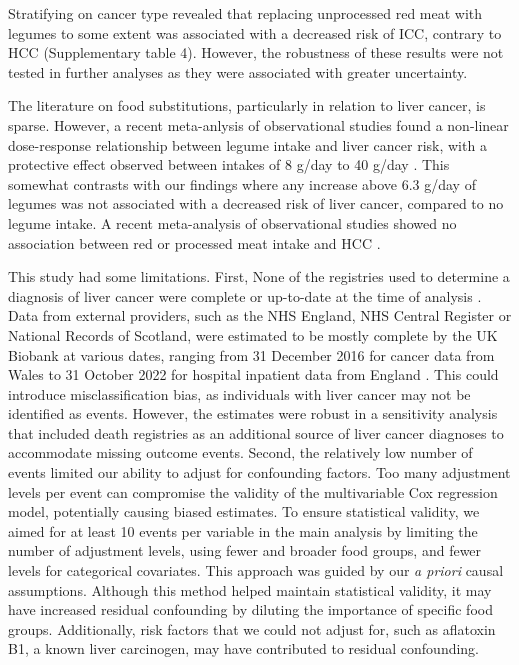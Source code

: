 \documentclass[sn-basic,Numbered,pdflatex]{sn-jnl}
\begin{document}
Stratifying on cancer type revealed that replacing unprocessed red meat
with legumes to some extent was associated with a decreased risk of ICC,
contrary to HCC (Supplementary table 4). However, the robustness of
these results were not tested in further analyses as they were
associated with greater uncertainty.

The literature on food substitutions, particularly in relation to liver
cancer, is sparse. However, a recent meta-anlysis of observational
studies found a non-linear dose-response relationship between legume
intake and liver cancer risk, with a protective effect observed between
intakes of 8 g/day to 40 g/day \citep{liu2023a}. This somewhat contrasts with
our findings where any increase above 6.3 g/day of legumes was not
associated with a decreased risk of liver cancer, compared to no legume
intake. A recent meta-analysis of observational studies showed no
association between red or processed meat intake and HCC \citep{Di2023}.

This study had some limitations. First, None of the registries used to
determine a diagnosis of liver cancer were complete or up-to-date at the
time of analysis \citep{RN112}. Data from external providers, such as the NHS
England, NHS Central Register or National Records of Scotland, were
estimated to be mostly complete by the UK Biobank at various dates,
ranging from 31 December 2016 for cancer data from Wales to 31 October
2022 for hospital inpatient data from England \citep{RN114}. This could
introduce misclassification bias, as individuals with liver cancer may
not be identified as events. However, the estimates were robust in a
sensitivity analysis that included death registries as an additional
source of liver cancer diagnoses to accommodate missing outcome events.
Second, the relatively low number of events limited our ability to
adjust for confounding factors. Too many adjustment levels per event can
compromise the validity of the multivariable Cox regression model,
potentially causing biased estimates. To ensure statistical validity, we
aimed for at least 10 events per variable in the main analysis by
limiting the number of adjustment levels, using fewer and broader food
groups, and fewer levels for categorical covariates. This approach was
guided by our \emph{a priori} causal assumptions. Although this method helped
maintain statistical validity, it may have increased residual
confounding by diluting the importance of specific food groups.
Additionally, risk factors that we could not adjust for, such as
aflatoxin B1, a known liver carcinogen, may have contributed to residual
confounding.
\end{document}
